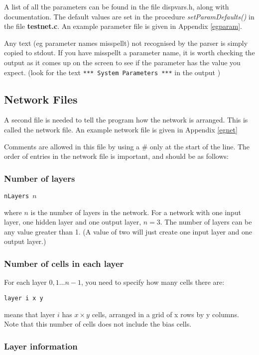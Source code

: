 \documentclass[a4paper]{article}
\begin{document}
A list of all the parameters can be found in the file dispvars.h,
along with documentation.   The default values are set in the
procedure {\em setParamDefaults()} in the file {\bf testnet.c}.  An example
parameter file is given in Appendix \ref{egparam}.
 
Any text (eg parameter names misspellt)  not recognised by the parser
is simply copied to stdout.  If you have misspellt a parameter name,
it is worth checking the output as it comes up on the screen to see if
the parameter has the value you expect. (look for the text \texttt{*** System
Parameters ***} in the output )

\subsection{Network Files}
A second file is needed to tell the program how the network is
arranged.  This is called the network file.  An example network file
is given in Appendix \ref{egnet}

Comments are allowed in this file by using a \# only at the start of
the line.  The order of entries in the network file is important, and should be
as follows:

\subsubsection{Number of layers}

\texttt{nLayers $n$}

where $n$ is the number of layers in the network. For a network with one
input layer, one hidden layer and one output layer, $n=3$.  The number
of layers can be any value greater than 1.  (A value of two will just
create one input layer and one output layer.)

\subsubsection{Number of cells in each layer}

For each layer $0,1 \ldots n-1$, you need to specify how many cells
there are:

\texttt{layer i x y}

means that layer $i$ has $x \times y$ cells, arranged in a grid of x rows by
y columns.  Note that this number of cells does not include the bias cells.

\subsubsection{Layer information}
\end{document}
